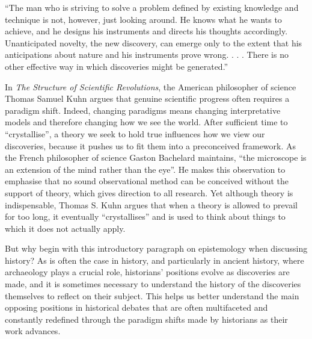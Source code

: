 \documentclass[11pt,a4paper]{article}
\begin{document}
\thispagestyle{empty}
\par\medskip
{}
\smallskip{}
\medskip
\noindent{\color{accent}\rule{\linewidth}{0.8pt}}\par\smallskip
{}\par\bigskip

``The man who is striving to solve a problem defined by existing knowledge and technique is not, however, just looking around. He knows what he wants to achieve, and he designs his instruments and directs his thoughts accordingly. Unanticipated novelty, the new discovery, can emerge only to the extent that his anticipations about nature and his instruments prove wrong. . . . There is no other effective way in which discoveries might be generated.''

In \emph{The Structure of Scientific Revolutions}, the American philosopher of science Thomas Samuel Kuhn argues that genuine scientific progress often requires a paradigm shift. Indeed, changing paradigms means changing interpretative models and therefore changing how we see the world. After sufficient time to ``crystallise'', a theory we seek to hold true influences how we view our discoveries, because it pushes us to fit them into a preconceived framework. As the French philosopher of science Gaston Bachelard maintains, ``the microscope is an extension of the mind rather than the eye''. He makes this observation to emphasise that no sound observational method can be conceived without the support of theory, which gives direction to all research. Yet although theory is indispensable, Thomas S. Kuhn argues that when a theory is allowed to prevail for too long, it eventually ``crystallises'' and is used to think about things to which it does not actually apply.

But why begin with this introductory paragraph on epistemology when discussing history? As is often the case in history, and particularly in ancient history, where archaeology plays a crucial role, historians' positions evolve as discoveries are made, and it is sometimes necessary to understand the history of the discoveries themselves to reflect on their subject. This helps us better understand the main opposing positions in historical debates that are often multifaceted and constantly redefined through the paradigm shifts made by historians as their work advances.
\end{document}
